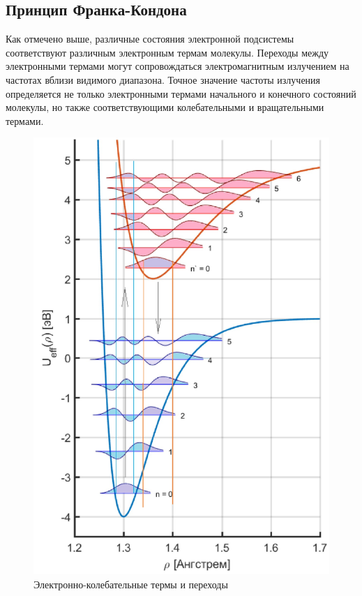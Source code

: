 \documentclass[a4paper, 12pt]{article}
\begin{document}
\subsection{Принцип Франка-Кондона}
Как отмечено выше, различные состояния электронной подсистемы соответствуют различным электронным термам молекулы. Переходы между электронными термами могут сопровождаться электромагнитным излучением на частотах вблизи видимого диапазона. Точное значение частоты излучения определяется не только электронными термами начального и конечного состояний молекулы, но также соответствующими колебательными и вращательными термами.
\begin{figure}[h]
\centering
\includegraphics[scale=0.5]{Therms.png}
\caption{Электронно-колебательные термы и переходы}
\label{fig:Therms}
\end{figure}
\end{document}
